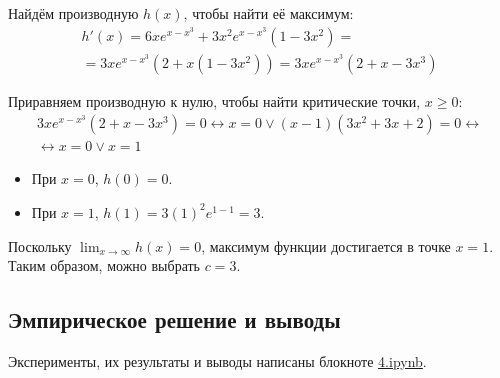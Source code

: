 \documentclass[a4paper,14pt]{extarticle}
\begin{document}
                    Найдём производную $h(x)$, чтобы найти её максимум:
                    \begin{gather*}
                            h'(x) = 6x e^{x - x^3} + 3x^2 e^{x - x^3} (1 - 3x^2) = \\
                            = 3x e^{x - x^3} (2 + x(1 - 3x^2)) = 3x e^{x - x^3} (2 + x - 3x^3)
                    \end{gather*}
                    
                    Приравняем производную к нулю, чтобы найти критические точки, $x \geq 0$:
                    \begin {gather*}
                            3x e^{x - x^3} (2 + x - 3x^3) = 0 \leftrightarrow
                            x = 0 \lor (x-1)(3x^2 + 3x + 2) = 0 \leftrightarrow \\
                            \leftrightarrow x = 0 \lor x = 1
                    \end{gather*}
                    
                    \begin{itemize}
                            \item При $x=0$, $h(0) = 0$.
                            \item При $x=1$, $h(1) = 3(1)^2 e^{1-1} = 3$.
                    \end{itemize}
                    
                    Поскольку $\lim_{x \to \infty} h(x) = 0$, максимум функции достигается в точке $x=1$.
                    Таким образом, можно выбрать $c = 3$.
        
        \subsection*{Эмпирическое решение и выводы}
            Эксперименты, их результаты и выводы написаны блокноте \href{https://github.com/vorandpav/TVIPS}{4.ipynb}.
\end{document}
